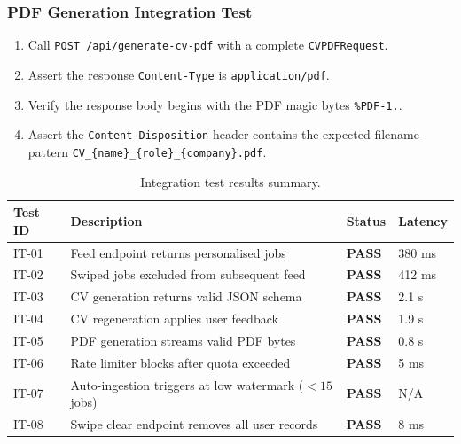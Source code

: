\documentclass[12pt, a4paper, oneside]{report}
\begin{document}
\subsubsection*{PDF Generation Integration Test}

\begin{enumerate}[itemsep=3pt]
  \item Call \texttt{POST /api/generate-cv-pdf} with a complete \texttt{CVPDFRequest}.
  \item Assert the response \texttt{Content-Type} is \texttt{application/pdf}.
  \item Verify the response body begins with the PDF magic bytes \texttt{\%PDF-1.}.
  \item Assert the \texttt{Content-Disposition} header contains the expected filename
        pattern \texttt{CV\_\{name\}\_\{role\}\_\{company\}.pdf}.
\end{enumerate}

\begin{table}[H]
  \centering
  \caption{Integration test results summary.}
  \label{tab:integration-results}
  \renewcommand{\arraystretch}{1.3}
  \begin{tabularx}{\textwidth}{@{} l X l l @{}}
    \toprule
    \textbf{Test ID} & \textbf{Description}                         & \textbf{Status} & \textbf{Latency} \\
    \midrule
    IT-01 & Feed endpoint returns personalised jobs               & \textbf{PASS} & 380 ms \\
    IT-02 & Swiped jobs excluded from subsequent feed             & \textbf{PASS} & 412 ms \\
    IT-03 & CV generation returns valid JSON schema               & \textbf{PASS} & 2.1 s  \\
    IT-04 & CV regeneration applies user feedback                 & \textbf{PASS} & 1.9 s  \\
    IT-05 & PDF generation streams valid PDF bytes                & \textbf{PASS} & 0.8 s  \\
    IT-06 & Rate limiter blocks after quota exceeded              & \textbf{PASS} & 5 ms   \\
    IT-07 & Auto-ingestion triggers at low watermark ($<15$ jobs) & \textbf{PASS} & N/A    \\
    IT-08 & Swipe clear endpoint removes all user records         & \textbf{PASS} & 8 ms   \\
    \bottomrule
  \end{tabularx}
\end{table}
\end{document}
